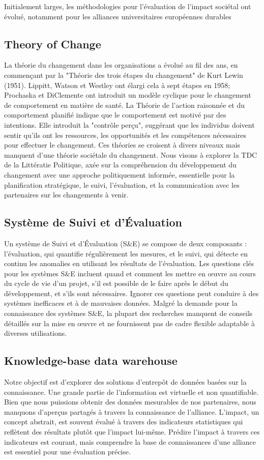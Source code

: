 Initialement larges, les méthodologies pour l'évaluation de l'impact sociétal ont évolué, notamment pour les alliances universitaires européennes durables

\subsection{Theory of Change}
La théorie du changement dans les organisations a évolué au fil des ans, en commençant par la "Théorie des trois étapes du changement" de Kurt Lewin (1951). Lippitt, Watson et Westley ont élargi cela à sept étapes en 1958; Prochaska et DiClemente ont introduit un modèle cyclique pour le changement de comportement en matière de santé. La Théorie de l’action raisonnée et du comportement planifié indique que le comportement est motivé par des intentions. Elle introduit la "contrôle perçu", suggérant que les individus doivent sentir qu'ils ont les ressources, les opportunités et les compétences nécessaires pour effectuer le changement. Ces théories se croisent à divers niveaux mais manquent d'une théorie sociétale du changement. Nous visons à explorer la TDC de la Littératie Politique, axée sur la compréhension du développement du changement avec une approche politiquement informée, essentielle pour la planification stratégique, le suivi, l'évaluation, et la communication avec les partenaires sur les changements à venir.

\subsection{Système de Suivi et d'Évaluation }
Un système de Suivi et d'Évaluation (S\&E) se compose de deux composants : l'évaluation, qui quantifie régulièrement les mesures, et le suivi, qui détecte en continu les anomalies en utilisant les résultats de l'évaluation. Les questions clés pour les systèmes S\&E incluent quand et comment les mettre en œuvre au cours du cycle de vie d'un projet, s'il est possible de le faire après le début du développement, et s'ils sont nécessaires. Ignorer ces questions peut conduire à des systèmes inefficaces et à de mauvaises données. Malgré la demande pour la connaissance des systèmes S\&E, la plupart des recherches manquent de conseils détaillés sur la mise en œuvre et ne fournissent pas de cadre flexible adaptable à diverses utilisations.

\subsection{Knowledge-base data warehouse}
Notre objectif est d'explorer des solutions d'entrepôt de données basées sur la connaissance. Une grande partie de l'information est virtuelle et non quantifiable. Bien que nous puissions obtenir des données mesurables de nos partenaires, nous manquons d'aperçus partagés à travers la connaissance de l'alliance. L'impact, un concept abstrait, est souvent évalué à travers des indicateurs statistiques qui reflètent des résultats plutôt que l'impact lui-même. Prédire l'impact à travers ces indicateurs est courant, mais comprendre la base de connaissances d'une alliance est essentiel pour une évaluation précise. 